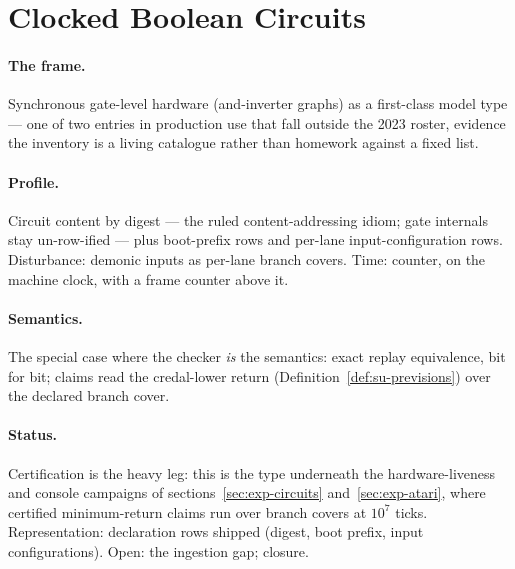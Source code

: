 



\section{Clocked Boolean Circuits}
\label{sec:mt-circuit}

\paragraph{The frame.} Synchronous gate-level hardware
(and-inverter graphs) as a first-class model type --- one of two
entries in production use that fall outside the 2023 roster,
evidence the inventory is a living catalogue rather than homework
against a fixed list.

\paragraph{Profile.} Circuit content by digest --- the ruled
content-addressing idiom; gate internals stay un-row-ified --- plus
boot-prefix rows and per-lane input-configuration rows. Disturbance:
demonic inputs as per-lane branch covers. Time: counter, on the
machine clock, with a frame counter above it.

\paragraph{Semantics.} The special case where the checker \emph{is}
the semantics: exact replay equivalence, bit for bit; claims read
the credal-lower return (Definition~\ref{def:su-previsions}) over
the declared branch cover.

\paragraph{Status.} Certification is the heavy leg: this is the type
underneath the hardware-liveness and console campaigns of
sections~\ref{sec:exp-circuits} and~\ref{sec:exp-atari}, where
certified minimum-return claims run over branch covers at $10^7$
ticks. Representation: declaration rows shipped (digest, boot
prefix, input configurations). Open: the ingestion gap; closure.

